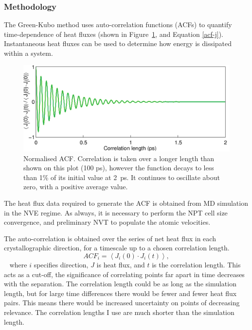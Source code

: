 \subsubsection{Methodology}


The Green-Kubo method uses auto-correlation functions (ACFs) to quantify time-dependence of heat fluxes (shown in Figure~\ref{fig:gk_acf}, and Equation \ref{acf-j}). Instantaneous heat fluxes can be used to determine how energy is dissipated within a system.%

\begin{figure}[h]
\includegraphics[width=\linewidth]{Figures/gk_acf.png}
\caption{Normalised ACF. Correlation is taken over a longer length than shown on this plot (100 ps), however the function decays to less than 1\% of its initial value at 2~ps. It continues to oscillate about zero, with a positive average value.}
\label{fig:gk_acf}
\end{figure}

The heat flux data required to generate the ACF is obtained from MD simulation in the NVE regime. As always, it is necessary to perform the NPT cell size convergence, and preliminary NVT to populate the atomic velocities.

The auto-correlation is obtained over the series of net heat flux in each crystallographic direction, for a timescale up to a chosen correlation length. 
~
\begin{equation}
ACF_i = \left \langle J_i(0) \cdot  J_i(t) \right \rangle,
\label{acf-j}
\end{equation}
~
where $i$ specifies direction, $J$ is heat flux, and $t$ is the correlation length. This acts as a cut-off, the significance of correlating points far apart in time decreases with the separation. The correlation length could be as long as the simulation length, but for large time differences there would be fewer and fewer heat flux pairs. This means there would be increased uncertainty on points of decreasing relevance. The correlation lengths I use are much shorter than the simulation length.  

